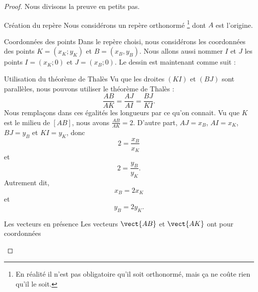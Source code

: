 \begin{proof}
    Nous divisons la preuve en petits pas.
    \begin{subproof}
        \item[Création du repère]
            Nous considérons un repère orthonormé \footnote{En réalité il n'est pas obligatoire qu'il soit orthonormé, mais ça ne coûte rien qu'il le soit.} dont \( A\) est l'origine.
        \item[Coordonnées des points]
            Dans le repère choisi, nous considérons les coordonnées des points \( K=(x_K;y_K)\) et \( B=(x_B,y_B)\). Nous allons aussi nommer \( I\) et \( J\) les points \( I=(x_K;0)\) et \( J=(x_B;0)\). Le dessin est maintenant comme suit :

            \begin{center}

            \end{center}
        \item[Utilisation du théorème de Thalès]
            Vu que les droites \( (KI)\) et \( (BJ)\) sont parallèles, nous pouvons utiliser le théorème de Thalès :
            \begin{equation}
                \frac{ AB }{ AK }=\frac{ AJ }{ AI }=\frac{ BJ }{ KI }.
            \end{equation}
            Nous remplaçons dans ces égalités les longueurs par ce qu'on connait. Vu que \( K\) est le milieu de \( [AB] \), nous avons \( \frac{ AB }{ AK }=2\). D'autre part, $AJ=x_B$, \( AI=x_K\), \( BJ=y_B\) et \( KI=y_K\), donc
            \begin{equation}
                2=\frac{ x_B }{ x_K }
            \end{equation}
            et
            \begin{equation}
                2=\frac{ y_B }{ y_K }.
            \end{equation}
            Autrement dit,
            \begin{equation}
                x_B=2x_K
            \end{equation}
            et
            \begin{equation}
                y_B=2y_K.
            \end{equation}
        \item[Les vecteurs en présence]
            Les vecteurs \( \vect{ AB }\) et \( \vect{ AK }\) ont pour coordonnées

\end{subproof}
\end{proof}

